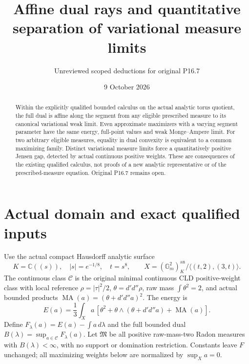 \documentclass[11pt]{article}
\title{Affine dual rays and quantitative separation of variational measure limits}
\author{Unreviewed scoped deductions for original P16.7}
\date{9 October 2026}
\newcommand{\C}{\mathcal C}
\newcommand{\M}{\mathfrak M}
\newcommand{\MA}{\operatorname{MA}}
\begin{document}
\maketitle
\begin{abstract}
Within the explicitly qualified bounded calculus on the actual analytic
torus quotient, the full dual is affine along the segment from any
eligible prescribed measure to its canonical variational weak limit.
Even approximate maximizers with a varying segment parameter have the
same energy, full-point values and weak Monge--Ampere limit.
For two arbitrary eligible measures, equality in dual convexity is
equivalent to a common maximizing family. Distinct variational measure
limits force a quantitatively positive Jensen gap, detected by actual
continuous positive weights. These are consequences of the existing
qualified calculus, not proofs of a new analytic representative or of
the prescribed-measure equation. Original P16.7 remains open.
\end{abstract}

\section{Actual domain and exact qualified inputs}
Use the actual compact Hausdorff analytic surface
\[
 K=\mathbb C((s)),\quad |s|=e^{-1/8},\quad t=s^8,\qquad
 X=(\mathbb G_m^2)^{\mathrm{an}}_K/\langle(t,2),(3,t)\rangle.
\]
The continuous class $\C$ is the original minimal continuous CLD
positive-weight class with local reference $\rho=|\tau|^2/2$,
$\theta=d'd''\rho$, raw mass $\int\theta^2=2$, and actual bounded
products $\MA(a)=(\theta+d'd''a)^2$. The energy is
\[
 E(a)=\frac13\int_Xa\,[\theta^2+
       \theta\wedge(\theta+d'd''a)+\MA(a)].
\]
Define $F_\lambda(a)=E(a)-\int a\,d\lambda$ and the full bounded
dual $B(\lambda)=\sup_{a\in\C}F_\lambda(a)$. Let $\M$ be all
positive raw-mass-two Radon measures with $B(\lambda)<\infty$,
with no support or domination restriction. Constants leave $F$ unchanged;
all maximizing weights below are normalized by $\sup_Xa=0$.
\end{document}

